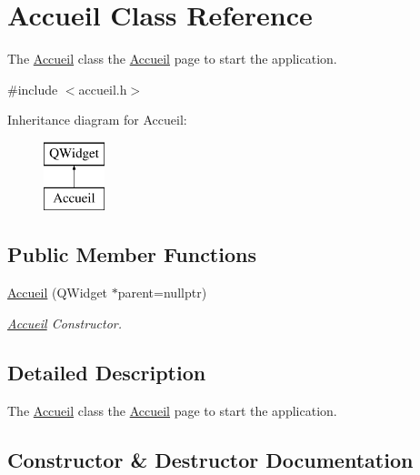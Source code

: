 \hypertarget{class_accueil}{}\section{Accueil Class Reference}
\label{class_accueil}


The \mbox{\hyperlink{class_accueil}{Accueil}} class the \mbox{\hyperlink{class_accueil}{Accueil}} page to start the application.  




{\ttfamily \#include $<$accueil.\+h$>$}

Inheritance diagram for Accueil\+:\begin{figure}[H]
\begin{center}
\leavevmode
\includegraphics[height=2.000000cm]{class_accueil}
\end{center}
\end{figure}
\subsection*{Public Member Functions}
\begin{DoxyCompactItemize}
\item 
\mbox{\hyperlink{class_accueil_a77c09f454c594d7889abe0fea916192b}{Accueil}} (Q\+Widget $\ast$parent=nullptr)
\begin{DoxyCompactList}\small\item\em \mbox{\hyperlink{class_accueil}{Accueil}} Constructor. \end{DoxyCompactList}\end{DoxyCompactItemize}


\subsection{Detailed Description}
The \mbox{\hyperlink{class_accueil}{Accueil}} class the \mbox{\hyperlink{class_accueil}{Accueil}} page to start the application. 

\subsection{Constructor \& Destructor Documentation}
\mbox{\label{class_accueil_a77c09f454c594d7889abe0fea916192b}} 
